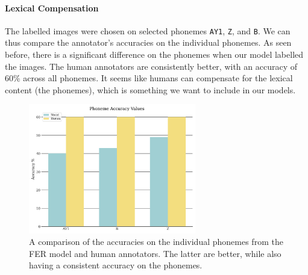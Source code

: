 \paragraph{Lexical Compensation}
The labelled images were chosen on selected phonemes \texttt{AY1}, \texttt{Z}, and \texttt{B}. We can thus compare the annotator's accuracies on the individual phonemes. As seen before, there is a significant difference on the phonemes when our model labelled the images. The human annotators are consistently better, with an accuracy of 60\% across all phonemes. It seems like humans can compensate for the lexical content (the phonemes), which is something we want to include in our models.

\begin{figure}
    \centering
    \includegraphics[width=0.65\textwidth]{res/Phone_model_acc.png}
    \caption{A comparison of the accuracies on the individual phonemes from the FER model and human annotators. The latter are better, while also having a consistent accuracy on the phonemes.}
    \label{fig:phone_model_human}
\end{figure}

